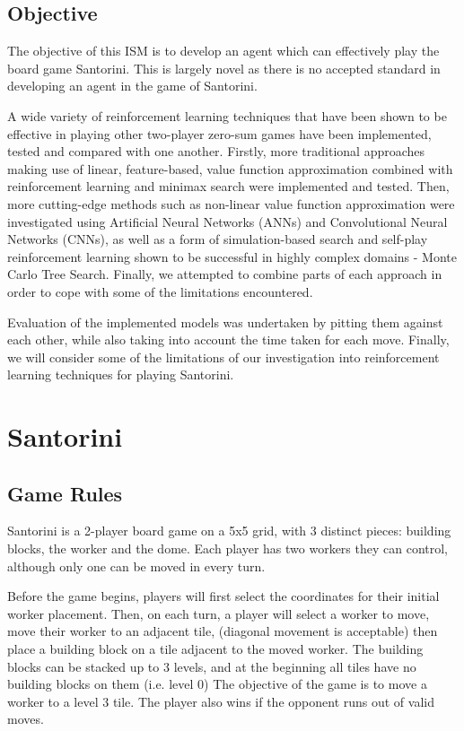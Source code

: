 \documentclass[a4paper,12pt,table]{article}
\begin{document}
\subsection{Objective}

The objective of this ISM is to develop an agent which can effectively play the board game Santorini. This is largely novel as there is no accepted standard in developing an agent in the game of Santorini. \par

A wide variety of reinforcement learning techniques that have been shown to be effective in playing other two-player zero-sum games have been implemented, tested and compared with one another. Firstly, more traditional approaches making use of linear, feature-based, value function approximation combined with reinforcement learning and minimax search were implemented and tested. Then, more cutting-edge methods such as non-linear value function approximation were investigated using Artificial Neural Networks (ANNs) and Convolutional Neural Networks (CNNs), as well as a form of simulation-based search and self-play reinforcement learning shown to be successful in highly complex domains - Monte Carlo Tree Search. Finally, we attempted to combine parts of each approach in order to cope with some of the limitations encountered. \par

Evaluation of the implemented models was undertaken by pitting them against each other, while also taking into account the time taken for each move. Finally, we will consider some of the limitations of our investigation into reinforcement learning techniques for playing Santorini.

\section{Santorini}

\subsection{Game Rules}

Santorini is a 2-player board game on a 5x5 grid, with 3 distinct pieces: building blocks, the worker and the dome. Each player has two workers they can control, although only one can be moved in every turn. \par

Before the game begins, players will first select the coordinates for their initial worker placement. Then, on each turn, a player will select a worker to move, move their worker to an adjacent tile, (diagonal movement is acceptable) then place a building block on a tile adjacent to the moved worker. The building blocks can be stacked up to 3 levels, and at the beginning all tiles have no building blocks on them (i.e. level 0) The objective of the game is to move a worker to a level 3 tile. The player also wins if the opponent runs out of valid moves. \par
\end{document}
